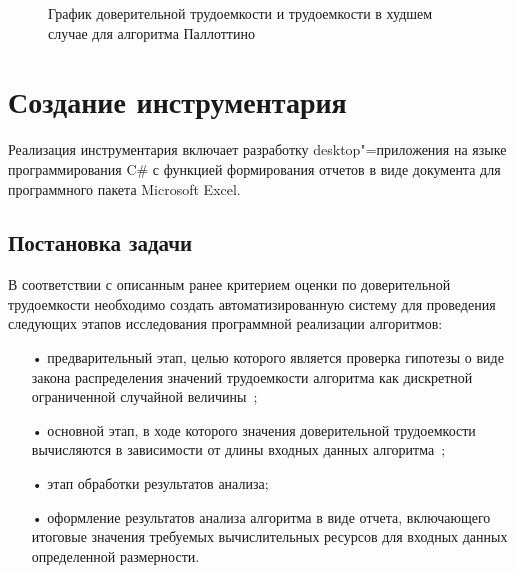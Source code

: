 \documentclass[a4paper, article, 14pt]{extarticle}
\begin{document}
\begin{figure}[h]
	\caption{График доверительной трудоемкости и трудоемкости в худшем случае для алгоритма Паллоттино}
	\label{fig:comparison_complexities}
\end{figure}

\section{Создание инструментария}\label{sec:analysis_system}

Реализация инструментария включает разработку desktop"=приложения на языке программирования C\# с функцией формирования отчетов в виде документа для программного пакета Microsoft Excel.

\subsection{Постановка задачи}\label{sec:technical_task}

В соответствии с описанным ранее критерием оценки по доверительной трудоемкости необходимо создать автоматизированную систему для проведения следующих этапов исследования программной реализации алгоритмов:

\begin{enumerate}
	\item[•] предварительный этап, целью которого является проверка гипотезы о виде закона распределения значений трудоемкости алгоритма как дискретной ограниченной случайной величины~\cite{petrushyn_ulyanov_planning};

	\item[•] основной этап, в ходе которого значения доверительной трудоемкости вычисляются в зависимости от длины входных данных алгоритма~\cite{petrushyn_ulyanov_analysis};

	\item[•] этап обработки результатов анализа;

	\item[•] оформление результатов анализа алгоритма в виде отчета, включающего итоговые значения требуемых вычислительных ресурсов для входных данных определенной размерности.
\end{enumerate}
\end{document}
